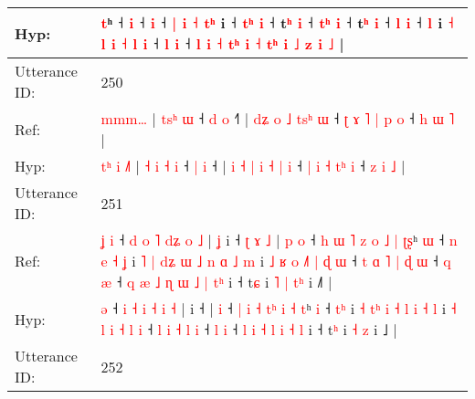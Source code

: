 \documentclass[10pt]{article}
\DeclareRobustCommand{\hl}[1]{{\textcolor{red}{#1}}}
\begin{document}
\begin{longtable}{ll}
 \\
Hyp: & \hl{t}ʰ\hl{}\hl{}\hl{} ˧\hl{}\hl{} \hl{i} ˧\hl{}\hl{}\hl{}\hl{} \hl{i} ˧ \hl{|} \hl{i} \hl{˧} \hl{}\hl{t}\hl{ʰ} i\hl{} ˧\hl{}\hl{}\hl{}\hl{}\hl{} \hl{}\hl{t}\hl{ʰ} \hl{i} ˧ t\hl{ʰ} \hl{i} ˧\hl{}\hl{}\hl{}\hl{} \hl{}\hl{t}\hl{ʰ} \hl{i} ˧ t\hl{ʰ} \hl{i} ˧ \hl{l} \hl{i} ˧ \hl{l} i\hl{}\hl{} \hl{˧} \hl{l} \hl{i} \hl{˧} \hl{l} \hl{i} ˧ \hl{l} \hl{i} ˧\hl{}\hl{}\hl{}\hl{} \hl{l} \hl{}\hl{i} \hl{˧} \hl{}\hl{t}\hl{ʰ} \hl{i} \hl{˧} \hl{}\hl{t}\hl{ʰ} \hl{i} \hl{˩} \hl{z} \hl{i} \hl{}\hl{˩} |
 \\
\midrule
Utterance ID: & 250 \\
Ref: & \hl{}\hl{}\hl{}\hl{m}\hl{m}\hl{m}\hl{…} |\hl{}\hl{} \hl{t}\hl{s}\hl{ʰ} \hl{ɯ} ˧ \hl{d} \hl{o} ˧\hl{˥} | \hl{}\hl{d}\hl{ʑ} \hl{o} \hl{˩} \hl{t}\hl{s}\hl{ʰ} \hl{ɯ} ˧ \hl{ʈ} \hl{ɤ} \hl{˥} \hl{|}\hl{ }\hl{p} \hl{o} ˧ \hl{h} \hl{ɯ} \hl{˥} |
 \\
Hyp: & \hl{t}\hl{ʰ}\hl{ }\hl{i}\hl{ }\hl{˩}\hl{˥} |\hl{ }\hl{˧} \hl{i}\hl{ }\hl{˧} \hl{i} ˧ \hl{|} \hl{i} ˧\hl{} | \hl{i}\hl{ }\hl{˧} \hl{|} \hl{i} \hl{˧}\hl{ }\hl{|} \hl{i} ˧ \hl{|} \hl{i} \hl{˧} \hl{}\hl{t}\hl{ʰ} \hl{i} ˧ \hl{z} \hl{i} \hl{˩} |
 \\
\midrule
Utterance ID: & 251 \\
Ref: & \hl{ʝ}\hl{ }\hl{i} ˧ \hl{d} \hl{o} \hl{˥} \hl{d}\hl{ʑ} \hl{o} \hl{˩} |\hl{ }\hl{ʝ} i ˧\hl{ }\hl{ʈ}\hl{ }\hl{ɤ}\hl{ }\hl{˩} |\hl{ }\hl{p} \hl{o} ˧ \hl{h} \hl{ɯ} \hl{˥} \hl{z}\hl{ }\hl{o} \hl{˩} \hl{|} \hl{ʈ}\hl{ʂ}ʰ \hl{ɯ} ˧\hl{ }\hl{n}\hl{ }\hl{e} \hl{˧}\hl{ }\hl{ʝ} i\hl{ }\hl{˥} \hl{|} \hl{d}\hl{ʑ} \hl{ɯ} \hl{˩} \hl{n} \hl{ɑ} \hl{˩} \hl{m} i\hl{ }\hl{˩} \hl{ʁ} \hl{o} \hl{˩}\hl{˥} \hl{|} \hl{ɖ} \hl{ɯ} ˧\hl{ }\hl{t} \hl{ɑ} \hl{˥} \hl{|} \hl{ɖ} \hl{ɯ} ˧ \hl{q} \hl{æ} ˧\hl{ }\hl{q} \hl{æ} \hl{˩} \hl{ɳ} \hl{ɯ} \hl{˩} \hl{|} \hl{t}\hl{ʰ} i ˧ t\hl{ɕ} i\hl{ }\hl{˥} \hl{|} \hl{t}\hl{ʰ} i ˩\hl{˥} |
 \\
Hyp: & \hl{}\hl{}\hl{ə} ˧ \hl{i} \hl{˧} \hl{i} \hl{}\hl{˧} \hl{i} \hl{˧} |\hl{}\hl{} i ˧\hl{}\hl{}\hl{}\hl{}\hl{}\hl{} |\hl{}\hl{} \hl{i} ˧ \hl{|} \hl{i} \hl{˧} \hl{}\hl{t}\hl{ʰ} \hl{i} \hl{˧} \hl{}\hl{t}ʰ \hl{i} ˧\hl{}\hl{}\hl{}\hl{} \hl{}\hl{t}\hl{ʰ} i\hl{}\hl{} \hl{˧} \hl{t}\hl{ʰ} \hl{i} \hl{˧} \hl{l} \hl{i} \hl{˧} \hl{l} i\hl{}\hl{} \hl{˧} \hl{l} \hl{}\hl{i} \hl{˧} \hl{l} \hl{i} ˧\hl{}\hl{} \hl{l} \hl{i} \hl{˧} \hl{l} \hl{i} ˧ \hl{l} \hl{i} ˧\hl{}\hl{} \hl{l} \hl{i} \hl{˧} \hl{l} \hl{i} \hl{˧} \hl{}\hl{l} i ˧ t\hl{ʰ} i\hl{}\hl{} \hl{˧} \hl{}\hl{z} i ˩\hl{} |
 \\
\midrule
Utterance ID: & 252 \\

\end{longtable}
\end{document}

